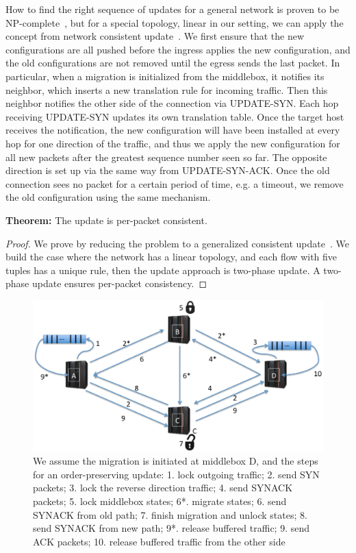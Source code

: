 How to find the right sequence of updates for a general network is proven to be NP-complete~\cite{SWAN, zUpdate}, but for a special topology, linear in our setting, we can apply the concept from network consistent update~\cite{consistentupdate, ratul}. We first ensure that the new configurations are all pushed before the ingress applies the new configuration, and the old configurations are not removed until the egress sends the last packet. In particular, when a migration is initialized from the middlebox, it notifies its neighbor, which inserts a new translation rule for incoming traffic. Then this neighbor notifies the other side of the connection via UPDATE-SYN. Each hop receiving UPDATE-SYN updates its own translation table. Once the target host receives the notification, the new configuration will have been installed at every hop for one direction of the traffic, and thus we apply the new configuration for all new packets after the greatest sequence number seen so far. The opposite direction is set up via the same way from UPDATE-SYN-ACK. Once the old connection sees no packet for a certain period of time, e.g. a timeout, we remove the old configuration using the same mechanism. 

\textbf{Theorem:} 
The update is per-packet consistent. 

\begin{proof}
We prove by reducing the problem to a generalized consistent update~\cite{consistentupdate}. We build the case where the network has a linear topology, and each flow with five tuples has a unique rule, then the update approach is two-phase update. A two-phase update ensures per-packet consistency. 
 
\end{proof}

\begin{figure}[ht]
\centering
\includegraphics[width=\linewidth]{figures/order_preserving.png} 

\caption{\small We assume the migration is initiated at middlebox D, and the steps for an order-preserving update: 1. lock outgoing traffic; 2. send SYN packets; 3. lock the reverse direction traffic; 4. send SYNACK packets; 5. lock middlebox states; 6*. migrate states; 6. send SYNACK from old path; 7. finish migration and unlock states; 8. send SYNACK from new path; 9*. release buffered traffic; 9. send ACK packets; 10. release buffered traffic from the other side}\label{orderpreserving}
\end{figure}

